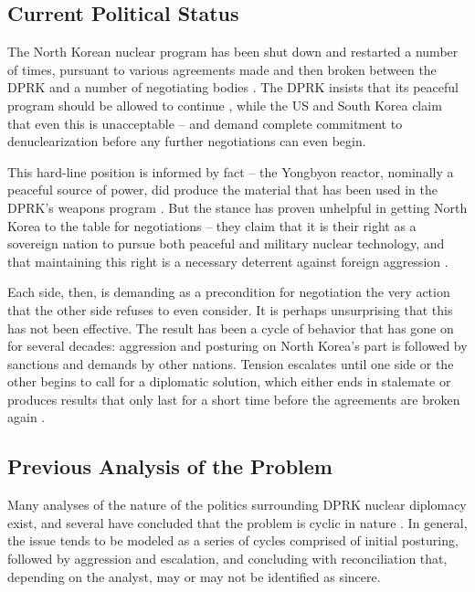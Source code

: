\documentclass{article}
\begin{document}
\subsection{Current Political Status}

The North Korean nuclear program has been shut down and restarted a number of times, pursuant to various agreements made and then broken between the DPRK and a number of negotiating bodies \cite{bajoria,davenport}. The DPRK insists that its peaceful program should be allowed to continue \cite{kcna2}, while the US and South Korea claim that even this is unacceptable \cite{lee} – and demand complete commitment to denuclearization before any further negotiations can even begin.

This hard-line position is informed by fact – the Yongbyon reactor, nominally a peaceful source of power, did produce the material that has been used in the DPRK’s weapons program \cite{hecker}. But the stance has proven unhelpful in getting North Korea to the table for negotiations – they claim that it is their right as a sovereign nation to pursue both peaceful and military nuclear technology, and that maintaining this right is a necessary deterrent against foreign aggression \cite{kcna,kcna2}.

Each side, then, is demanding as a precondition for negotiation the very action that the other side refuses to even consider. It is perhaps unsurprising that this has not been effective. The result has been a cycle of behavior that has gone on for several decades: aggression and posturing on North Korea’s part is followed by sanctions and demands by other nations. Tension escalates until one side or the other begins to call for a diplomatic solution, which either ends in stalemate or produces results that only last for a short time before the agreements are broken again \cite{bajoria, davenport}.

\subsection{Previous Analysis of the Problem}

Many analyses of the nature of the politics surrounding DPRK nuclear diplomacy exist, and several have concluded that the problem is cyclic in nature \cite{blair,cfr,fisher,gause,habib,jun}. In general, the issue tends to be modeled as a series of cycles comprised of initial posturing, followed by aggression and escalation, and concluding with reconciliation that, depending on the analyst, may or may not be identified as sincere.
\end{document}
